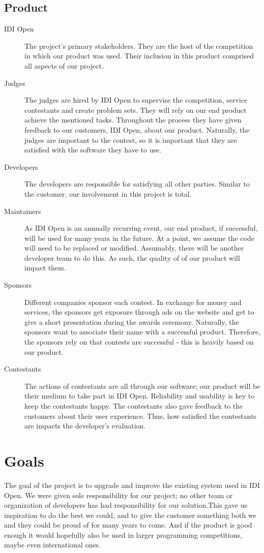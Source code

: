 \subsection{Product}
\begin{description}
\item[IDI Open]
The project's primary stakeholders. They are the host of
the competition in which our product was used. Their inclusion in this
product comprised all aspects of our project.

\item[Judges]
The judges are hired by IDI Open to supervise the competition, service
contestants and create problem sets. They will rely on our end product
achieve the mentioned tasks. Throughout the process they have given
feedback to our customers, IDI Open, about our product. Naturally, the
judges are important to the contest, so it is important that they are
satisfied with the software they have to use.

\item[Developers]
The developers are responsible for satisfying all other parties. Similar
to the customer, our involvement in this project is total.

\item[Maintainers]
As IDI Open is an annually recurring event, our end product, if
successful, will be used for many years in the future. At a point, we
assume the code will need to be replaced or modified. Assumably, there
will be another developer team to do this. As such, the quality of of
our product will impact them.

\item[Sponsors]
Different companies sponsor each contest. In exchange for money and
services, the sponsors get exposure through ads on the website and get
to give a short presentation during the awards ceremony. Naturally, the
sponsors want to associate their name with a successful product.
Therefore, the sponsors rely on that contests are successful - this is
heavily based on our product.

\item[Contestants]
The actions of contestants are all through our software; our product
will be their medium to take part in IDI Open. Reliability and
usability is key to keep the contestants happy. The contestants also
gave feedback to the customers about their user experience. Thus, how
satisfied the contestants are impacts the developer's
evaluation.
\end{description}

\section{Goals}
The goal of the project is to upgrade and improve the existing system
used in IDI Open. We were given sole responsibility for our project; no
other team or organization of developers has had responsibility for our
solution.This gave us inspiration to do the best we could, and to give
the customer something both we and they could be proud of for many
years to come. And if the product is good enough it would hopefully
also be used in larger programming competitions, maybe even
international ones.

